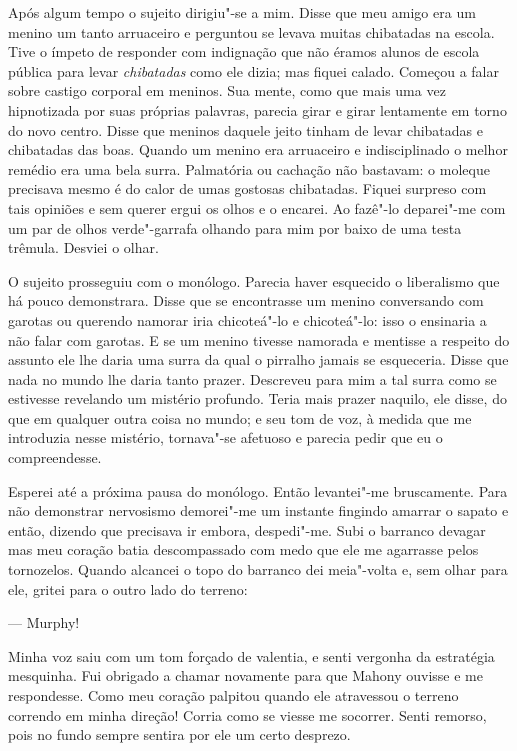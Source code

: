Após algum tempo o sujeito dirigiu"-se a mim.  Disse que meu amigo era um menino
um tanto arruaceiro e perguntou se levava muitas chibatadas na escola.  Tive o
ímpeto de responder com indignação que não éramos alunos de escola pública para
levar \textit{chibatadas} como ele dizia; mas fiquei calado.  Começou a falar
sobre castigo corporal em meninos.  Sua mente, como que mais uma vez
hipnotizada por suas próprias palavras, parecia girar e girar lentamente em
torno do novo centro.  Disse que meninos daquele jeito tinham de levar
chibatadas e chibatadas das boas.  Quando um menino era arruaceiro e
indisciplinado o melhor remédio era uma bela surra.  Palmatória ou cachação não
bastavam: o moleque precisava mesmo é do calor de umas gostosas chibatadas.
Fiquei surpreso com tais opiniões e sem querer ergui os olhos e o encarei.  Ao
fazê"-lo deparei"-me com um par de olhos verde"-garrafa olhando para mim por baixo
de uma testa trêmula.  Desviei o olhar.

O sujeito prosseguiu com o monólogo.  Parecia haver esquecido o liberalismo que
há pouco demonstrara.  Disse que se encontrasse um menino conversando com
garotas ou querendo namorar iria chicoteá"-lo e chicoteá"-lo: isso o ensinaria a
não falar com garotas.  E se um menino tivesse namorada e mentisse a respeito
do assunto ele lhe daria uma surra da qual o pirralho jamais se esqueceria.
Disse que nada no mundo lhe daria tanto prazer.  Descreveu para mim a tal surra
como se estivesse revelando um mistério profundo.  Teria mais prazer naquilo,
ele disse, do que em qualquer outra coisa no mundo; e seu tom de voz, à medida
que me introduzia nesse mistério, tornava"-se afetuoso e parecia pedir que eu o
compreendesse.

Esperei até a próxima pausa do monólogo.  Então levantei"-me bruscamente.  Para
não demonstrar nervosismo demorei"-me um instante fingindo amarrar o sapato e
então, dizendo que precisava ir embora, despedi"-me.  Subi o barranco devagar
mas meu coração batia descompassado com medo que ele me agarrasse pelos
tornozelos.  Quando alcancei o topo do barranco dei meia"-volta e, sem olhar
para ele, gritei para o outro lado do terreno:

--- Murphy!

Minha voz saiu com um tom forçado de valentia, e senti vergonha da estratégia
mesquinha.  Fui obrigado a chamar novamente para que Mahony ouvisse e me
respondesse.  Como meu coração palpitou quando ele atravessou o terreno
correndo em minha direção!  Corria como se viesse me socorrer.  Senti remorso,
pois no fundo sempre sentira por ele um certo desprezo.


